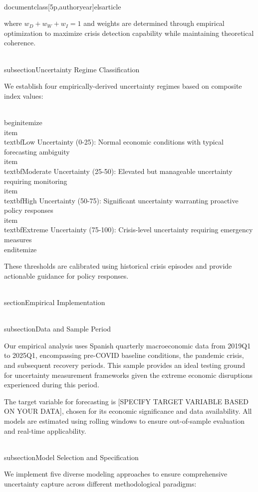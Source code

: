 \\documentclass[5p,authoryear]{elsarticle}
\begin{document}
where $w_D + w_W + w_I = 1$ and weights are determined through empirical optimization to maximize crisis detection capability while maintaining theoretical coherence.

\\subsection{Uncertainty Regime Classification}

We establish four empirically-derived uncertainty regimes based on composite index values:

\\begin{itemize}
    \\item \\textbf{Low Uncertainty (0-25):} Normal economic conditions with typical forecasting ambiguity
    \\item \\textbf{Moderate Uncertainty (25-50):} Elevated but manageable uncertainty requiring monitoring
    \\item \\textbf{High Uncertainty (50-75):} Significant uncertainty warranting proactive policy responses
    \\item \\textbf{Extreme Uncertainty (75-100):} Crisis-level uncertainty requiring emergency measures
\\end{itemize}

These thresholds are calibrated using historical crisis episodes and provide actionable guidance for policy responses.

\\section{Empirical Implementation}

\\subsection{Data and Sample Period}

Our empirical analysis uses Spanish quarterly macroeconomic data from 2019Q1 to 2025Q1, encompassing pre-COVID baseline conditions, the pandemic crisis, and subsequent recovery periods. This sample provides an ideal testing ground for uncertainty measurement frameworks given the extreme economic disruptions experienced during this period.

The target variable for forecasting is [SPECIFY TARGET VARIABLE BASED ON YOUR DATA], chosen for its economic significance and data availability. All models are estimated using rolling windows to ensure out-of-sample evaluation and real-time applicability.

\\subsection{Model Selection and Specification}

We implement five diverse modeling approaches to ensure comprehensive uncertainty capture across different methodological paradigms:
\end{document}
